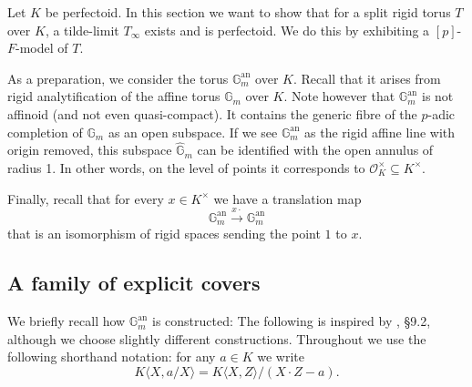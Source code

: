 \documentclass[11pt,oneside]{amsart}
\theoremstyle{definition}
\theoremstyle{remark}
\begin{document}
	Let $K$ be perfectoid. In this section we want to show that for a split rigid torus $T$ over $K$, a tilde-limit $T_\infty$ exists and is perfectoid. We do this by exhibiting a $[p]$-$F$-model of $T$.
	
	As a preparation, we consider the torus $\mathbb G_m^{\operatorname{an}}$ over $K$. Recall that it arises from rigid analytification of the affine torus $\mathbb G_m$ over $K$. Note however that $\mathbb G_m^{\operatorname{an}}$ is not affinoid (and not even quasi-compact). It contains the generic fibre of the $p$-adic completion of $\mathbb G_m$ as an open subspace. If we see $\mathbb G_m^{\operatorname{an}}$ as the rigid affine line with origin removed, this subspace $\widehat{\mathbb G}_m$ can be identified with the open annulus of radius 1. In other words, on the level of points it corresponds to $\mathcal O_K^\times \subseteq K^\times$.
	
	Finally, recall that for every $x\in K^\times$ we have a translation map
	\[\mathbb G_m^{\operatorname{an}}\xrightarrow{x\cdot} \mathbb G_m^{\operatorname{an}}\]
	that is an isomorphism of rigid spaces sending the point $1$ to $x$.
	
	\subsection{A family of explicit covers}
	We briefly recall how $\mathbb G_m^{\operatorname{an}}$ is constructed: The following is inspired by \cite{Bosch lectures}, \S 9.2, although we choose slightly different constructions. Throughout we use the following shorthand notation: for any $a\in K$ we write
	\[K\langle X,a/X\rangle = K\langle X,Z\rangle/(X\cdot Z - a). \]
	
\end{document}
